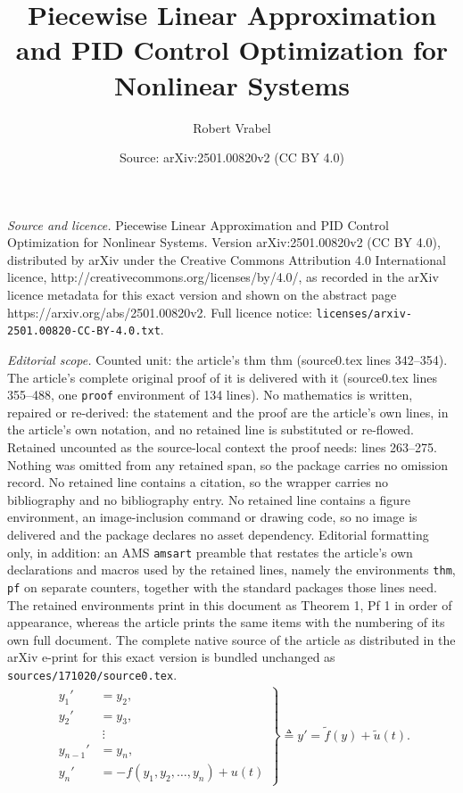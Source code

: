 \documentclass[10pt,a4paper]{amsart}
\title{Piecewise Linear Approximation and PID Control Optimization for Nonlinear Systems}
\author{Robert Vrabel}
\date{Source: arXiv:2501.00820v2 (CC BY 4.0)}
\begin{document}
\maketitle

\noindent\emph{Source and licence.} Piecewise Linear Approximation and PID Control Optimization for Nonlinear Systems. Version arXiv:2501.00820v2 (CC BY 4.0), distributed by arXiv under the Creative Commons Attribution 4.0 International licence, http://creativecommons.org/licenses/by/4.0/, as recorded in the arXiv licence metadata for this exact version and shown on the abstract page https://arxiv.org/abs/2501.00820v2. Full licence notice: \texttt{licenses/arxiv-2501.00820-CC-BY-4.0.txt}.\par\smallskip

\noindent\textit{Editorial scope.} Counted unit: the article's thm thm (source0.tex lines 342--354). The article's complete original proof of it is delivered with it (source0.tex lines 355--488, one \texttt{proof} environment of 134 lines). No mathematics is written, repaired or re-derived: the statement and the proof are the article's own lines, in the article's own notation, and no retained line is substituted or re-flowed.  Retained uncounted as the source-local context the proof needs: lines 263--275.  Nothing was omitted from any retained span, so the package carries no omission record.  No retained line contains a citation, so the wrapper carries no bibliography and no bibliography entry.  No retained line contains a figure environment, an image-inclusion command or drawing code, so no image is delivered and the package declares no asset dependency.  Editorial formatting only, in addition: an AMS \texttt{amsart} preamble that restates the article's own declarations and macros used by the retained lines, namely the environments \texttt{thm}, \texttt{pf} on separate counters, together with the standard packages those lines need.  The retained environments print in this document as Theorem 1, Pf 1 in order of appearance, whereas the article prints the same items with the numbering of its own full document.  The complete native source of the article as distributed in the arXiv e-print for this exact version is bundled unchanged as \texttt{sources/171020/source0.tex}.
\begin{equation}\label{nonlinear_system_1_order}
\begin{aligned}
\left.
\begin{array}{ll}
y_1' &= y_2, \\
y_2' &= y_3, \\
&\ \vdots \\
y_{n-1}' &= y_n, \\
y_n' &= -f(y_1, y_2, \dots, y_n) + u(t)
\end{array}
\right\} \triangleq y'=\tilde f(y)+\tilde u(t).
\end{aligned}  
\end{equation}
\end{document}
